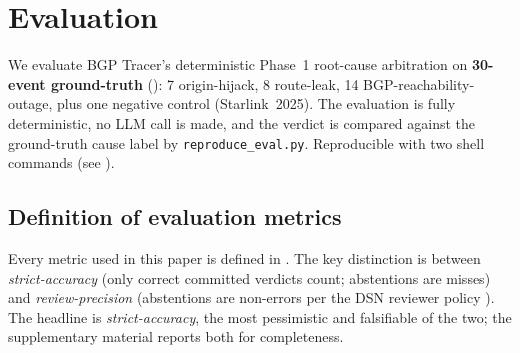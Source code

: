 
\section{Evaluation}
\label{sec:evaluation}

We evaluate BGP Tracer's deterministic Phase~1 root-cause
arbitration on \textbf{30-event ground-truth}
(): 7 origin-hijack,
8 route-leak, 14 BGP-reachability-outage, plus one negative
control (Starlink~2025). The
evaluation is fully deterministic, no LLM call is made, and
the verdict is compared against the ground-truth cause label
by \texttt{reproduce\_eval.py}. Reproducible
with two shell commands (see ).

\subsection{Definition of evaluation metrics}
\label{sec:metrics-def}

Every metric used in this paper is defined in
. The key distinction is between
\emph{strict-accuracy} (only correct committed verdicts
count; abstentions are misses) and \emph{review-precision}
(abstentions are non-errors per the DSN reviewer policy
\cite{review-policy}). The headline is
\emph{strict-accuracy}, the most pessimistic and
falsifiable of the two; the supplementary material reports
both for completeness.

